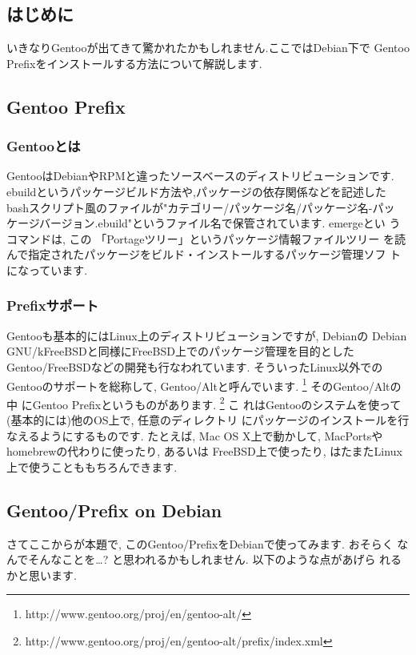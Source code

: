 \documentclass[mingoth,a4paper]{jsarticle}
\begin{document}
\label{sec:your-label}

\subsection{はじめに}

いきなりGentooが出てきて驚かれたかもしれません.ここではDebian下で
Gentoo Prefixをインストールする方法について解説します.

\subsection{Gentoo Prefix}
\subsubsection{Gentooとは}
GentooはDebianやRPMと違ったソースベースのディストリビューションです.
ebuildというパッケージビルド方法や,パッケージの依存関係などを記述した
bashスクリプト風のファイルが"カテゴリー/パッケージ名/パッケージ名-パッ
ケージバージョン.ebuild"というファイル名で保管されています. emergeとい
うコマンドは, この 「Portageツリー」というパッケージ情報ファイルツリー
を読んで指定されたパッケージをビルド・インストールするパッケージ管理ソフ
トになっています.

\subsubsection{Prefixサポート}

Gentooも基本的にはLinux上のディストリビューションですが, Debianの
Debian GNU/kFreeBSDと同様にFreeBSD上でのパッケージ管理を目的とした
Gentoo/FreeBSDなどの開発も行なわれています. そういったLinux以外での
Gentooのサポートを総称して, Gentoo/Altと呼んでいます.
\footnote{http://www.gentoo.org/proj/en/gentoo-alt/} そのGentoo/Altの中
にGentoo Prefixというものがあります.
\footnote{http://www.gentoo.org/proj/en/gentoo-alt/prefix/index.xml} こ
れはGentooのシステムを使って(基本的には)他のOS上で, 任意のディレクトリ
にパッケージのインストールを行なえるようにするものです. たとえば, Mac
OS X上で動かして, MacPortsやhomebrewの代わりに使ったり, あるいは
FreeBSD上で使ったり, はたまたLinux上で使うことももちろんできます.

\subsection{Gentoo/Prefix on Debian}

さてここからが本題で, このGentoo/PrefixをDebianで使ってみます. おそらく
なんでそんなことを…? と思われるかもしれません. 以下のような点があげら
れるかと思います.
\end{document}
